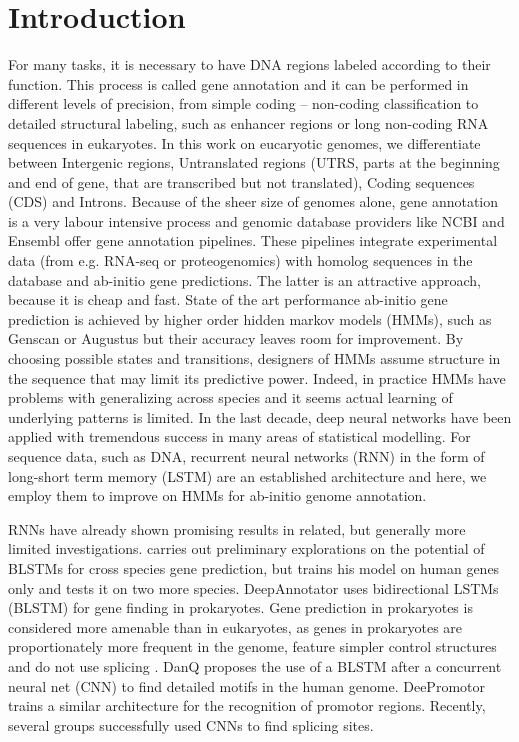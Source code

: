 \documentclass{bioinfo}
\begin{document}
\section{Introduction}
For many tasks, it is necessary to have DNA regions labeled according to their function. This process is called gene annotation and it can be performed in different levels of precision, from simple coding -- non-coding classification to detailed structural labeling, such as enhancer regions or long non-coding RNA sequences in eukaryotes. In this work on eucaryotic genomes, we differentiate between Intergenic regions, Untranslated regions (UTRS, parts at the beginning and end of gene, that are transcribed but not translated), Coding sequences (CDS) and Introns. Because of the sheer size of genomes alone, gene annotation is a very labour intensive process and genomic database providers like NCBI \citep{thibaud2013eukaryotic} and Ensembl \citep{aken2016ensembl} offer gene annotation pipelines. These pipelines integrate experimental data (from e.g. RNA-seq or proteogenomics) with homolog sequences in the database and ab-initio gene predictions. The latter is an attractive approach, because it is cheap and fast. State of the art performance ab-initio gene prediction is achieved by higher order hidden markov models (HMMs), such as Genscan \citep{burge1997prediction} or Augustus \citep{stanke2003gene} but their accuracy leaves room for improvement. By choosing possible states and transitions, designers of HMMs assume structure in the sequence that may limit its predictive power. Indeed, in practice HMMs have problems with generalizing across species and it seems actual learning of underlying patterns is limited. In the last decade, deep neural networks have been applied with tremendous success in many areas of statistical modelling. For sequence data, such as DNA, recurrent neural networks (RNN) in the form of long-short term memory (LSTM) are an established architecture and here, we employ them to improve on HMMs for ab-initio genome annotation.

RNNs have already shown promising results in related, but generally more limited investigations. \citep{choudharypredicting} carries out preliminary explorations on the potential of BLSTMs for cross species gene prediction, but trains his model on human genes only and tests it on two more species. DeepAnnotator \citep{amin2018deepannotator} uses bidirectional LSTMs (BLSTM) for gene finding in prokaryotes. Gene prediction in prokaryotes is considered more amenable than in eukaryotes, as genes in prokaryotes are proportionately more frequent in the genome, feature simpler control structures and do not use splicing \citep{wang2004brief}. DanQ \citep{quang2016danq} proposes the use of a BLSTM after a concurrent neural net (CNN) to find detailed motifs in the human genome. DeePromotor \citep{oubounyt2019deepromoter} trains a similar architecture for the recognition of promotor regions. Recently, several groups \citep{jaganathan2019predicting, wang2019splicefinder} successfully used CNNs to find splicing sites.
\end{document}
